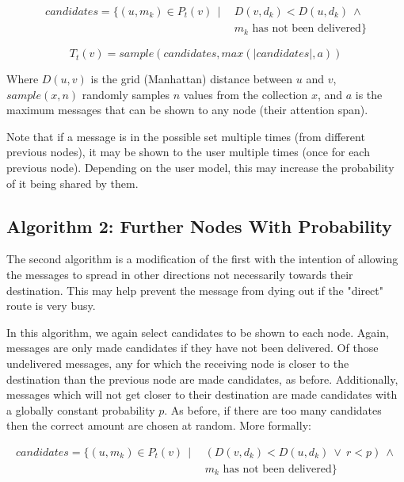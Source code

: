 \documentclass[bsc,frontabs,twoside,singlespacing,parskip,deptreport]{infthesis}     %
\begin{document}
\begin{equation}
\begin{split}
candidates = \{ (u, m_{k}) \in P_{t}(v) \:\: | \:\: & D(v, d_{k}) < D(u, d_{k}) \: \wedge \\
& m_{k} \mbox{ has not been delivered} \}
\end{split}
\end{equation}

\begin{equation}
T_{t}(v) = sample(candidates, max(|candidates|, a))
\end{equation}

Where $D(u, v)$ is the grid (Manhattan) distance between $u$ and $v$, $sample(x, n)$ randomly samples $n$ values from the collection $x$, and $a$ is the maximum messages that can be shown to any node (their attention span).

Note that if a message is in the possible set multiple times (from different previous nodes), it may be shown to the user multiple times (once for each previous node). Depending on the user model, this may increase the probability of it being shared by them.

\subsection{Algorithm 2: Further Nodes With Probability}
The second algorithm is a modification of the first with the intention of allowing the messages to spread in other directions not necessarily towards their destination. This may help prevent the message from dying out if the "direct" route is very busy.

In this algorithm, we again select candidates to be shown to each node. Again, messages are only made candidates if they have not been delivered. Of those undelivered messages, any for which the receiving node is closer to the destination than the previous node are made candidates, as before. Additionally, messages which will not get closer to their destination are made candidates with a globally constant probability $p$. As before, if there are too many candidates then the correct amount are chosen at random. More formally:

\begin{equation}
\begin{split}
candidates = \{ (u, m_{k}) \in P_{t}(v) \:\: | \:\: & (D(v, d_{k}) < D(u, d_{k}) \: \vee \: r < p) \: \wedge \\
& m_{k} \mbox{ has not been delivered} \}
\end{split}
\end{equation}
\end{document}
